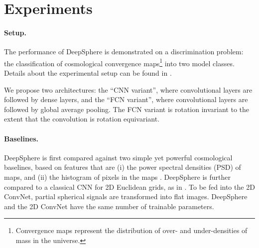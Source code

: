 \documentclass{article} %
\newcommand{\1}{\b{1}}              %
\newcommand{\0}{\b{0}}              %
\newcommand{\todo}[1]{{\color[rgb]{.6,.1,.6}{#1}}}
\begin{document}
\section{Experiments}


\paragraph{Setup.}
The performance of DeepSphere is demonstrated on a discrimination problem: the classification of cosmological convergence maps\footnote{Convergence maps represent the distribution of over- and under-densities of mass in the universe.} into two model classes.
Details about the experimental setup can be found in \cite{perraudin2018deepsphere}.


We propose two architectures: the ``CNN variant'', where convolutional layers are followed by dense layers, and the ``FCN variant'', where convolutional layers are followed by global average pooling.
The FCN variant is rotation invariant to the extent that the convolution is rotation equivariant.

\paragraph{Baselines.}
DeepSphere is first compared against two simple yet powerful cosmological baselines, based on features that are (i) the power spectral densities (PSD) of maps, and (ii) the histogram of pixels in the maps \citep{patton2017cosmologicalconstraints}.
DeepSphere is further compared to a classical CNN for 2D Euclidean grids, as in \citep{krachmalnicoff2019convolutional}.
To be fed into the 2D ConvNet, partial spherical signals are transformed into flat images.
DeepSphere and the 2D ConvNet have the same number of trainable parameters.
\end{document}
